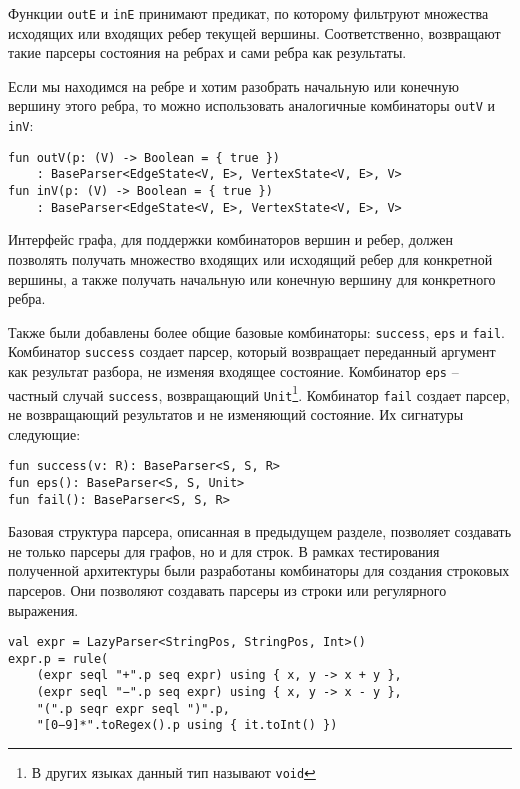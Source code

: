 Функции \verb|outE| и \verb|inE| принимают предикат, по которому фильтруют множества исходящих или входящих ребер текущей вершины. Соответственно, возвращают такие парсеры состояния на ребрах и сами ребра как результаты.

Если мы находимся на ребре и хотим разобрать начальную или конечную вершину этого ребра, то можно использовать аналогичные комбинаторы \verb|outV| и \verb|inV|:
\begin{lstlisting}
fun outV(p: (V) -> Boolean = { true })
    : BaseParser<EdgeState<V, E>, VertexState<V, E>, V>
fun inV(p: (V) -> Boolean = { true })
    : BaseParser<EdgeState<V, E>, VertexState<V, E>, V>
\end{lstlisting}

Интерфейс графа, для поддержки комбинаторов вершин и ребер, должен позволять получать множество входящих или исходящий ребер для конкретной вершины, а также получать начальную или конечную вершину для конкретного ребра.

Также были добавлены более общие базовые комбинаторы: \verb|success|, \verb|eps| и \verb|fail|.
Комбинатор \verb|success| создает парсер, который возвращает переданный аргумент как результат разбора, не изменяя входящее состояние.
Комбинатор \verb|eps| -- частный случай \verb|success|, возвращающий \verb|Unit|\footnote{В других языках данный тип называют \texttt{void}}.
Комбинатор \verb|fail| создает парсер, не возвращающий результатов и не изменяющий состояние.
Их сигнатуры следующие:
\begin{lstlisting}
fun success(v: R): BaseParser<S, S, R>  
fun eps(): BaseParser<S, S, Unit>
fun fail(): BaseParser<S, S, R>
\end{lstlisting}

Базовая структура парсера, описанная в предыдущем разделе, позволяет создавать не только парсеры для графов, но и для строк.
В рамках тестирования полученной архитектуры были разработаны комбинаторы для создания строковых парсеров.
Они позволяют создавать парсеры из строки или регулярного выражения.

\begin{lstlisting}[float=ht, label=lst:stringParser, caption=Пример строкового парсера]
val expr = LazyParser<StringPos, StringPos, Int>()
expr.p = rule(
    (expr seql "+".p seq expr) using { x, y -> x + y },
    (expr seql "−".p seq expr) using { x, y -> x - y },
    "(".p seqr expr seql ")".p,
    "[0−9]*".toRegex().p using { it.toInt() })
\end{lstlisting}


